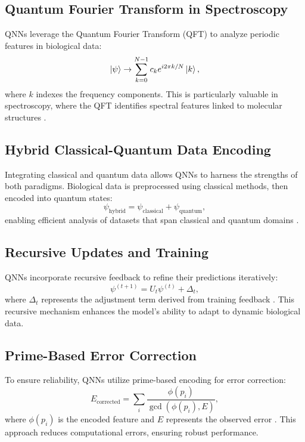 \documentclass{article}
\theoremstyle{plain}
\begin{document}
\subsection{Quantum Fourier Transform in Spectroscopy}
QNNs leverage the Quantum Fourier Transform (QFT) to analyze periodic features in biological data:
\begin{equation}
\ket{\psi} \rightarrow \sum_{k=0}^{N-1} c_k e^{i 2\pi k / N} \ket{k},
\end{equation}
where $k$ indexes the frequency components. This is particularly valuable in spectroscopy, where the QFT identifies spectral features linked to molecular structures \cite{qftSpectroscopy2022}.

\subsection{Hybrid Classical-Quantum Data Encoding}
Integrating classical and quantum data allows QNNs to harness the strengths of both paradigms. Biological data is preprocessed using classical methods, then encoded into quantum states:
\begin{equation}
\psi_{\text{hybrid}} = \psi_{\text{classical}} + \psi_{\text{quantum}},
\end{equation}
enabling efficient analysis of datasets that span classical and quantum domains \cite{hybridEncoding2023}.

\subsection{Recursive Updates and Training}
QNNs incorporate recursive feedback to refine their predictions iteratively:
\begin{equation}
\psi^{(t+1)} = U_t \psi^{(t)} + \Delta_t,
\end{equation}
where $\Delta_t$ represents the adjustment term derived from training feedback \cite{qnnTraining2023}. This recursive mechanism enhances the model’s ability to adapt to dynamic biological data.

\subsection{Prime-Based Error Correction}
To ensure reliability, QNNs utilize prime-based encoding for error correction:
\begin{equation}
E_{\text{corrected}} = \sum_{i} \frac{\phi(p_i)}{\gcd(\phi(p_i), E)},
\end{equation}
where $\phi(p_i)$ is the encoded feature and $E$ represents the observed error \cite{primeCorrection2022}. This approach reduces computational errors, ensuring robust performance.
\end{document}
